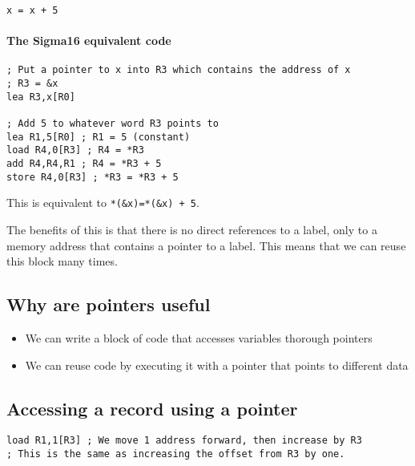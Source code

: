\begin{verbatim}
x = x + 5
\end{verbatim}

\paragraph{The Sigma16 equivalent code}\label{par:the_sigma16_equivalent_code}

\begin{verbatim}
; Put a pointer to x into R3 which contains the address of x
; R3 = &x
lea R3,x[R0]

; Add 5 to whatever word R3 points to
lea R1,5[R0] ; R1 = 5 (constant)
load R4,0[R3] ; R4 = *R3
add R4,R4,R1 ; R4 = *R3 + 5
store R4,0[R3] ; *R3 = *R3 + 5
\end{verbatim}
\begin{note}
	This is equivalent to \texttt{*(&x)=*(&x) + 5}.
\end{note}
The benefits of this is that there is no direct references to a label, only to a memory address that contains a pointer to a label.
This means that we can reuse this block many times.

\subsection{Why are pointers useful}\label{sub:why_are_pointers_useful}

\begin{itemize}
	\item We can write a block of code that accesses variables thorough pointers
	\item We can reuse code by executing it with a pointer that points to different data
\end{itemize}

\subsection{Accessing a record using a pointer}\label{sub:accessing_a_record_using_a_pointer}

\begin{verbatim}
load R1,1[R3] ; We move 1 address forward, then increase by R3
; This is the same as increasing the offset from R3 by one.
\end{verbatim}

